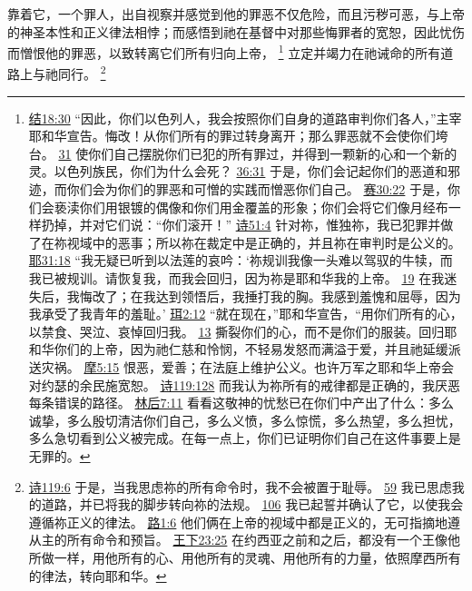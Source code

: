 \documentclass[12pt, a4paper, oneside]{ctexart}
\newcounter{parnum}[section]
\newcommand{\N}{%
   \noindent\refstepcounter{parnum}%
    \makebox[\parindent][l]{\textbf{\arabic{parnum}.}}}
\begin{document}
\N 靠着它，一个罪人，出自视察并感觉到他的罪恶不仅危险，而且污秽可恶，与上帝的神圣本性和正义律法相悖；而感悟到祂在基督中对那些悔罪者的宽恕，因此忧伤而憎恨他的罪恶，以致转离它们所有归向上帝，
	\footnote {
		\href{https://biblehub.com/ezekiel/18-30.htm}{结18:30} “因此，你们以色列人，我会按照你们自身的道路审判你们各人，”主宰耶和华宣告。悔改！从你们所有的罪过转身离开；那么罪恶就不会使你们垮台。
		\href{https://biblehub.com/ezekiel/18-31.htm}{31} 使你们自己摆脱你们已犯的所有罪过，并得到一颗新的心和一个新的灵。以色列族民，你们为什么会死？
		\href{https://biblehub.com/ezekiel/36-31.htm}{36:31} 于是，你们会记起你们的恶道和邪迹，而你们会为你们的罪恶和可憎的实践而憎恶你们自己。
		\href{https://biblehub.com/isaiah/30-22.htm}{赛30:22} 于是，你们会亵渎你们用银镀的偶像和你们用金覆盖的形象；你们会将它们像月经布一样扔掉，并对它们说：“你们滚开！”
		\href{https://biblehub.com/psalms/51-4.htm}{诗51:4} 针对祢，惟独祢，我已犯罪并做了在祢视域中的恶事；所以祢在裁定中是正确的，并且祢在审判时是公义的。
		\href{https://biblehub.com/jeremiah/31-18.htm}{耶31:18} “我无疑已听到以法莲的哀吟：‘祢规训我像一头难以驾驭的牛犊，而我已被规训。请恢复我，而我会回归，因为祢是耶和华我的上帝。
		\href{https://biblehub.com/jeremiah/31-19.htm}{19} 在我迷失后，我悔改了；在我达到领悟后，我捶打我的胸。我感到羞愧和屈辱，因为我承受了我青年的羞耻。’
		\href{https://biblehub.com/joel/2-12.htm}{珥2:12} “就在现在，”耶和华宣告，“用你们所有的心，以禁食、哭泣、哀悼回归我。
		\href{https://biblehub.com/joel/2-13.htm}{13} 撕裂你们的心，而不是你们的服装。回归耶和华你们的上帝，因为祂仁慈和怜悯，不轻易发怒而满溢于爱，并且祂延缓派送灾祸。
		\href{https://biblehub.com/amos/5-15.htm}{摩5:15} 恨恶，爱善；在法庭上维护公义。也许万军之耶和华上帝会对约瑟的余民施宽恕。
		\href{https://biblehub.com/psalms/119-128.htm}{诗119:128} 而我认为祢所有的戒律都是正确的，我厌恶每条错误的路径。
		\href{https://biblehub.com/2_corinthians/7-11.htm}{林后7:11} 看看这敬神的忧愁已在你们中产出了什么：多么诚挚，多么殷切清洁你们自己，多么义愤，多么惊慌，多么热望，多么担忧，多么急切看到公义被完成。在每一点上，你们已证明你们自己在这件事要上是无罪的。
	}
	立定并竭力在祂诫命的所有道路上与祂同行。
	\footnote {
		\href{https://biblehub.com/psalms/119-6.htm}{诗119:6} 于是，当我思虑祢的所有命令时，我不会被置于耻辱。
		\href{https://biblehub.com/psalms/119-59.htm}{59} 我已思虑我的道路，并已将我的脚步转向祢的法规。
        \href{https://biblehub.com/psalms/119-106.htm}{106} 我已起誓并确认了它，以使我会遵循祢正义的律法。
		\href{https://biblehub.com/luke/1-6.htm}{路1:6} 他们俩在上帝的视域中都是正义的，无可指摘地遵从主的所有命令和预旨。
		\href{https://biblehub.com/2_kings/23-25.htm}{王下23:25} 在约西亚之前和之后，都没有一个王像他所做一样，用他所有的心、用他所有的灵魂、用他所有的力量，依照摩西所有的律法，转向耶和华。
	}
\end{document}
